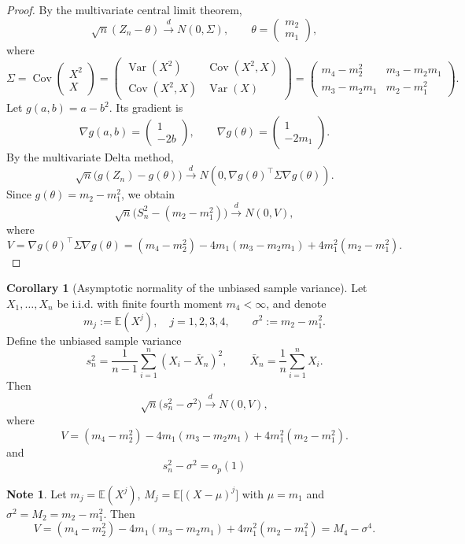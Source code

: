 \documentclass[11pt]{article}
\theoremstyle{definition}
\newtheorem{note}{Note}[section]
\newtheorem{corollary}{Corollary}[section]
\begin{document}
\begin{proof}
By the multivariate central limit theorem,
\[
\sqrt{n}(Z_n - \theta)
\xrightarrow{d}
N(0, \Sigma),
\qquad
\theta =
\begin{pmatrix}
m_2 \\
m_1
\end{pmatrix},
\]
where
\[
\Sigma
=
\operatorname{Cov}
\begin{pmatrix}
X^2 \\
X
\end{pmatrix}
=
\begin{pmatrix}
\operatorname{Var}(X^2) & \operatorname{Cov}(X^2, X) \\
\operatorname{Cov}(X^2, X) & \operatorname{Var}(X)
\end{pmatrix}
=
\begin{pmatrix}
m_4 - m_2^2 & m_3 - m_2 m_1 \\
m_3 - m_2 m_1 & m_2 - m_1^2
\end{pmatrix}.
\]
Let $g(a,b)=a-b^2$. Its gradient is
\[
\nabla g(a,b)
=
\begin{pmatrix}
1 \\
-2b
\end{pmatrix},
\qquad
\nabla g(\theta)
=
\begin{pmatrix}
1 \\
-2m_1
\end{pmatrix}.
\]
By the multivariate Delta method,
\[
\sqrt{n}\big(g(Z_n)-g(\theta)\big)
\xrightarrow{d}
N\!\left(0, \nabla g(\theta)^\top \Sigma \nabla g(\theta)\right).
\]
Since $g(\theta)=m_2-m_1^2$, we obtain
\[
\sqrt{n}\big(S_n^2-(m_2-m_1^2)\big)
\xrightarrow{d}
N(0,V),
\]
where
\[
V
=
\nabla g(\theta)^\top \Sigma \nabla g(\theta)
=
(m_4 - m_2^2)
- 4 m_1 (m_3 - m_2 m_1)
+ 4 m_1^2 (m_2 - m_1^2).
\]
\end{proof}

\begin{corollary}[Asymptotic normality of the unbiased sample variance]
Let $X_1,\dots,X_n$ be i.i.d. with finite fourth moment $m_4<\infty$, and denote
\[
m_j := \mathbb{E}(X^j), \quad j=1,2,3,4,
\qquad
\sigma^2 := m_2 - m_1^2.
\]
Define the unbiased sample variance
\[
s_n^2 = \frac{1}{n-1}\sum_{i=1}^n (X_i - \bar X_n)^2,
\qquad
\bar X_n = \frac{1}{n}\sum_{i=1}^n X_i.
\]
Then
\[
\sqrt{n}\big(s_n^2 - \sigma^2\big)
\xrightarrow{d}
N(0, V),
\]
where
\[
V
=
(m_4 - m_2^2)
- 4 m_1 (m_3 - m_2 m_1)
+ 4 m_1^2 (m_2 - m_1^2).
\]
and
$$
s_n^2-\sigma^2 = o_p(1)
$$
\end{corollary}

\begin{note}
Let $m_j=\mathbb{E}(X^j)$, $M_j=\mathbb{E}\big[(X-\mu)^j\big]$ with $\mu=m_1$ and 
$\sigma^2=M_2=m_2-m_1^2$. Then
\[
V=(m_4 - m_2^2)
- 4 m_1 (m_3 - m_2 m_1)
+ 4 m_1^2 (m_2 - m_1^2)
=
M_4 - \sigma^4.
\]
\end{note}
\end{document}
